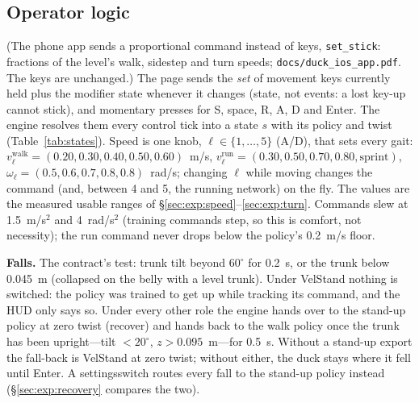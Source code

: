 \documentclass[11pt]{article}
\newcommand{\code}[1]{\texttt{\small #1}}
\newcommand{\tab}[1]{Table~\ref{tab:#1}}
\newcommand{\gear}{\textsf{settings}}
\begin{document}
\subsection{Operator logic}\label{sec:operator}
(The phone app sends a proportional command instead of keys, \code{set\_stick}: fractions of the level's walk, sidestep and turn speeds; \code{docs/duck\_ios\_app.pdf}. The keys are unchanged.)
The page sends the \emph{set} of movement keys currently held plus the modifier state whenever it changes (state,
not events: a lost key-up cannot stick), and momentary presses for S, space, R, A, D and \textsf{Enter}. The engine
resolves them every control tick into a state $s$ with its policy and twist (\tab{states}). Speed is one knob,
$\ell\in\{1,\dots,5\}$ (A/D), that sets every gait:
$v^{\text{walk}}_\ell = (0.20, 0.30, 0.40, 0.50, 0.60)$~m/s, $v^{\text{run}}_\ell = (0.30, 0.50, 0.70, 0.80,
\text{sprint})$, $\omega_\ell = (0.5, 0.6, 0.7, 0.8, 0.8)$~rad/s; changing $\ell$ while moving changes the command
(and, between 4 and 5, the running network) on the fly. The values are the measured usable ranges of
\S\ref{sec:exp:speed}--\ref{sec:exp:turn}. Commands slew at 1.5~m/s$^2$ and 4~rad/s$^2$ (training commands step,
so this is comfort, not necessity); the run command never drops below the policy's 0.2~m/s floor.

\textbf{Falls.} The contract's test: trunk tilt beyond $60^\circ$ for 0.2~s, or the trunk below 0.045~m (collapsed
on the belly with a level trunk). Under VelStand nothing is switched: the policy was trained to get up while
tracking its command, and the HUD only says so. Under every other role the engine hands over to the stand-up
policy at zero twist (\textsf{recover}) and hands back to the walk policy once the trunk has been upright---tilt
$<20^\circ$, $z>0.095$~m---for 0.5~s. Without a stand-up export the fall-back is VelStand at zero twist; without
either, the duck stays where it fell until \textsf{Enter}. A \gear switch routes every fall to the stand-up policy
instead (\S\ref{sec:exp:recovery} compares the two).
\end{document}
